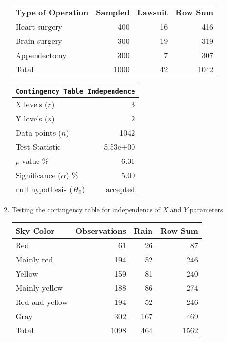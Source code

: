 \begin{enumerate}
	\begin{table}[H]
		\centering
		\begin{tabular}{lrrr}
			\toprule
			Type of Operation &   Sampled &   Lawsuit &  Row Sum \\
			\midrule
			Heart surgery     &                     400 &                     16 &      416 \\
			Brain surgery     &                     300 &                     19 &      319 \\
			Appendectomy      &                     300 &                      7 &      307 \\
			\midrule
			Total             &                    1000 &                     42 &     1042 \\
			\bottomrule
		\end{tabular}
		
	\end{table}
	\bigskip
	\begin{table}[H]
		\centering
		\begin{tabular}{@{}lr@{}}
			\toprule
			\multicolumn{2}{c}{\texttt{Contingency Table Independence}} \\
			\midrule
			X levels ($r$)             &         3 \\
			Y levels ($s$)             &         2 \\
			Data points ($n$)          &      1042 \\
			Test Statistic             &  5.53e+00 \\
			$p$ value \%               &      6.31 \\
			Significance ($\alpha$) \% &      5.00 \\
			null hypothesis ($H_0$)    &  accepted \\
			\bottomrule
		\end{tabular}
		
	\end{table}
	\bigskip
	
	\item Testing the contingency table for independence of $ X $ and $ Y $ parameters \\
	
	\begin{table}[H]
		\centering
		\begin{tabular}{lrrr}
			\toprule
			Sky Color &   Observations &   Rain &  Row Sum \\
			\midrule
			Red             &             61 &     26 &       87 \\
			Mainly red      &            194 &     52 &      246 \\
			Yellow          &            159 &     81 &      240 \\
			Mainly yellow   &            188 &     86 &      274 \\
			Red and yellow  &            194 &     52 &      246 \\
			Gray            &            302 &    167 &      469 \\
			\midrule
			Total           &           1098 &    464 &     1562 \\
			\bottomrule
		\end{tabular}
		

\end{table}
\end{enumerate}
